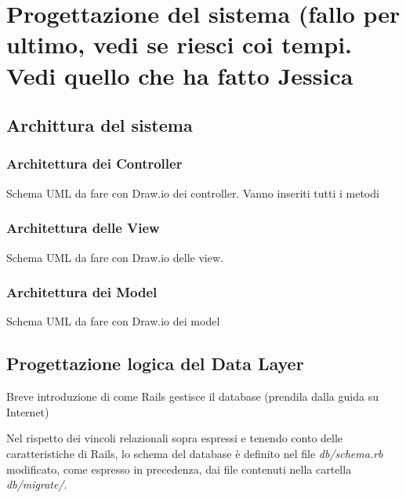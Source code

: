 \documentclass[Lau, binding=0.6cm]{sapthesis}
\begin{document}
\chapter{Progettazione del sistema (fallo per ultimo, vedi se riesci coi tempi. Vedi quello che ha fatto Jessica}

\section{Archittura del sistema}

\subsection{Architettura dei Controller}

Schema UML da fare con Draw.io dei controller. Vanno inseriti tutti i metodi

\subsection{Architettura delle View}

Schema UML da fare con Draw.io delle view. 

\subsection{Architettura dei Model}

Schema UML da fare con Draw.io dei model 

\section{Progettazione logica del Data Layer}

Breve introduzione di come Rails gestisce il database (prendila dalla guida su Internet)

Nel rispetto dei vincoli relazionali sopra espressi e tenendo conto delle caratteristiche di Rails, lo schema del database è definito nel file \textit{db/schema.rb} modificato, come espresso in precedenza, dai file contenuti nella cartella \textit{db/migrate/}.


\end{document}
